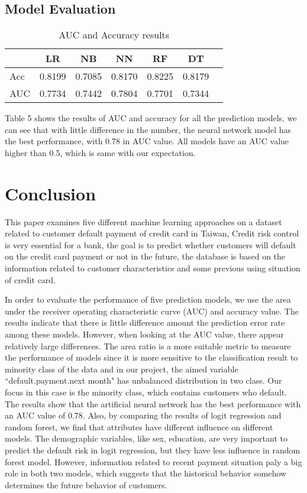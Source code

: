 \documentclass[a4paper,11pt]{article}
\begin{document}
\subsection{Model Evaluation}
\begin{table}[!htbp]
	\begin{center}
		\begin{tabular}{l|cccccc} 
			\hline\hline
			& LR & NB & NN & RF & DT\\ 
			\hline
			Acc & 0.8199 & 0.7085  & 0.8170 & 0.8225 & 0.8179  \\
			AUC & 0.7734  & 0.7442 & 0.7804 & 0.7701 & 0.7344\\
			\hline\hline
		\end{tabular}
		\caption{AUC and Accuracy results}
	\end{center}
\end{table}
Table 5 shows the results of AUC and accuracy for all the prediction models, we can see that with little difference in the number, the neural network model has the best performance, with 0.78 in AUC value. All models have an AUC value higher than 0.5, which is same with our expectation.

\newpage
\section{Conclusion}
This paper examines five different machine learning approaches on a dataset related to customer default payment of credit card in Taiwan, Credit risk control is very essential for a bank, the goal is to predict whether customers will default on the credit card payment or not in the future, the database is based on the information related to customer characteristics and some previous using situation of credit card.

In order to evaluate the performance of five prediction models, we use the area under the receiver operating characteristic curve (AUC) and accuracy value. The results indicate that there is little difference amount the prediction error rate among these models. However, when looking at the AUC value, there appear relatively large differences. The area ratio is a more suitable metric to measure the performance of models since it is more sensitive to the classification result to minority class of the data and in our project, the aimed variable ``default.payment.next month" has unbalanced distribution in two class. Our focus in this case is the minority class, which contains customers who default. The results show that the artificial neural network has the best performance with an AUC value of 0.78. Also, by comparing the results of logit regression and random forest, we find that attributes have different influence on different models. The demographic variables, like sex, education, are very important to predict the default risk in logit regression, but they have less influence in random forest model. However, information related to recent payment situation paly a big role in both two models, which suggests that the historical behavior somehow determines the future behavior of customers.
\end{document}
